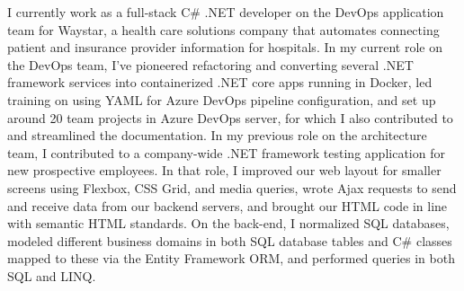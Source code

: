 I currently work as a full-stack C\# .NET developer on the DevOps application team for Waystar, a health care solutions company that automates connecting patient and insurance provider information for hospitals. In my current role on the DevOps team, I've pioneered refactoring and converting several .NET framework services into containerized .NET core apps running in Docker, led training on using YAML for Azure DevOps pipeline configuration, and set up around 20 team projects in Azure DevOps server, for which I also contributed to and streamlined the documentation. In my previous role on the architecture team, I contributed to a company-wide .NET framework testing application for new prospective employees. In that role, I improved our web layout for smaller screens using Flexbox, CSS Grid, and media queries, wrote Ajax requests to send and receive data from our backend servers, and brought our HTML code in line with semantic HTML standards. On the back-end, I normalized SQL databases, modeled different business domains in both SQL database tables and C\# classes mapped to these via the Entity Framework ORM, and performed queries in both SQL and LINQ.